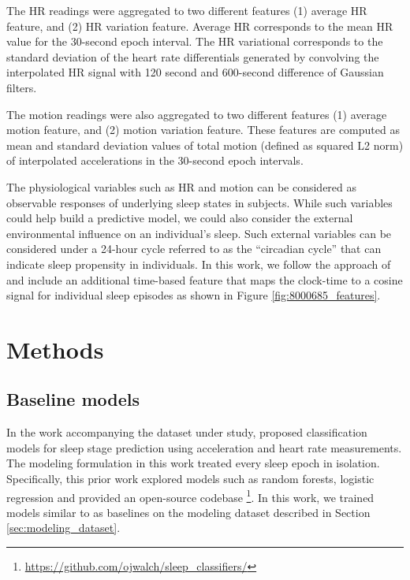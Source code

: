 \documentclass[12pt]{article}
\begin{document}
The HR readings were aggregated to two different features (1) average HR feature, and (2) HR variation feature. Average HR corresponds to the mean HR value for the 30-second epoch interval. The HR variational corresponds to the standard deviation of the heart rate differentials generated by convolving the interpolated HR signal with 120 second and 600-second difference of Gaussian filters. 


The motion readings were also aggregated to two different features (1) average motion feature, and (2) motion variation feature. These features are computed as mean and standard deviation values of total motion (defined as squared L2 norm) of interpolated accelerations in the 30-second epoch intervals.  


The physiological variables such as HR and motion can be considered as observable responses of underlying sleep states in subjects. While such variables could help build a predictive model, we could also consider the external environmental influence on an individual's sleep. Such external variables can be considered under a 24-hour cycle referred to as the ``circadian cycle'' that can indicate sleep propensity in individuals. In this work, we follow the approach of \cite{walch2019} and include an additional time-based feature that maps the clock-time to a cosine signal for individual sleep episodes as shown in Figure \ref{fig:8000685_features}.




\section{Methods}
\subsection{Baseline models} In the work accompanying the dataset under study, \citet{walch2019} proposed classification models for sleep stage prediction using acceleration and heart rate measurements. The modeling formulation in this work treated every sleep epoch in isolation. Specifically, this prior work explored models such as random forests, logistic regression and provided an open-source codebase \footnote{\url{https://github.com/ojwalch/sleep_classifiers/}}. In this work, we trained models similar to \citet{walch2019} as baselines on the modeling dataset described in Section \ref{sec:modeling_dataset}.




\end{document}
